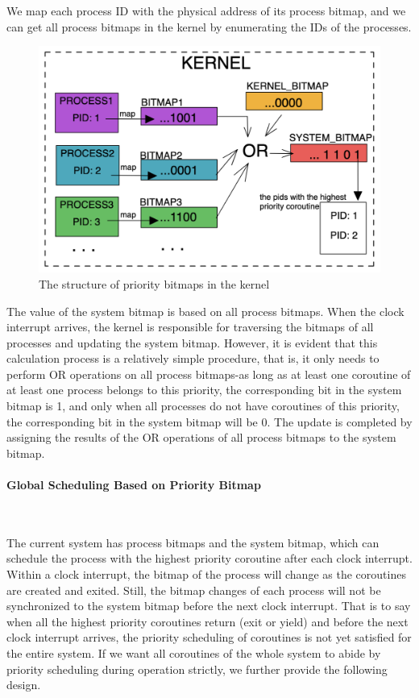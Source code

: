 \documentclass[10pt]{article}
\begin{document}
We map each process ID with the physical address of its process bitmap, and we can get all process bitmaps in the kernel by enumerating the IDs of the processes.

\begin{figure}[ht]
\begin{center}
\centerline{\includegraphics[width=\columnwidth]{bitmap.png}}
\caption{The structure of priority bitmaps in the kernel}
\label{bitmap}
\end{center}
\end{figure}

The value of the system bitmap is based on all process bitmaps. When the clock interrupt arrives, the kernel is responsible for traversing the bitmaps of all processes and updating the system bitmap. However, it is evident that this calculation process is a relatively simple procedure, that is, it only needs to perform OR operations on all process bitmaps-as long as at least one coroutine of at least one process belongs to this priority, the corresponding bit in the system bitmap is 1, and only when all processes do not have coroutines of this priority, the corresponding bit in the system bitmap will be 0. The update is completed by assigning the results of the OR operations of all process bitmaps to the system bitmap.

\paragraph{Global Scheduling Based on Priority Bitmap}~{}

The current system has process bitmaps and the system bitmap, which can schedule the process with the highest priority coroutine after each clock interrupt. Within a clock interrupt, the bitmap of the process will change as the coroutines are created and exited. Still, the bitmap changes of each process will not be synchronized to the system bitmap before the next clock interrupt. That is to say when all the highest priority coroutines return (exit or yield) and before the next clock interrupt arrives, the priority scheduling of coroutines is not yet satisfied for the entire system. If we want all coroutines of the whole system to abide by priority scheduling during operation strictly, we further provide the following design.
\end{document}
